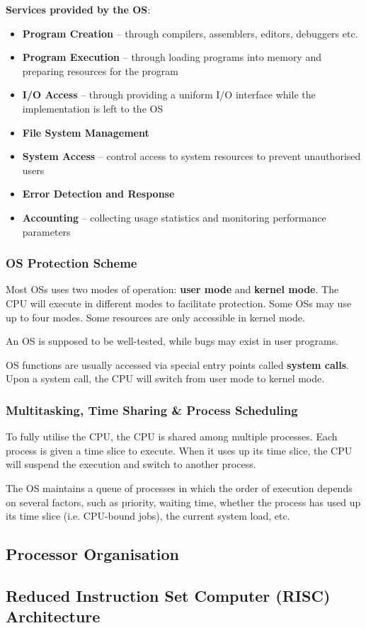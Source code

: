 \textbf{Services provided by the OS}:
\begin{itemize}
    \item \textbf{Program Creation} -- through compilers, assemblers, editors, debuggers etc.
    \item \textbf{Program Execution} -- through loading programs into memory and preparing resources for the program
    \item \textbf{I/O Access} -- through providing a uniform I/O interface while the implementation is left to the OS
    \item \textbf{File System Management}
    \item \textbf{System Access} -- control access to system resources to prevent unauthorised users
    \item \textbf{Error Detection and Response}
    \item \textbf{Accounting} -- collecting usage statistics and monitoring performance parameters
\end{itemize}

\subsubsection{OS Protection Scheme}

Most OSs uses two modes of operation: \textbf{user mode} and \textbf{kernel mode}.
The CPU will execute in different modes to facilitate protection. Some OSs may use up
to four modes. Some resources are only accessible in kernel mode.

An OS is supposed to be well-tested, while bugs may exist in user programs.

OS functions are usually accessed via special entry points called \textbf{system calls}.
Upon a system call, the CPU will switch from user mode to kernel mode.

\subsubsection{Multitasking, Time Sharing \& Process Scheduling}

To fully utilise the CPU, the CPU is shared among multiple processes. Each process
is given a time slice to execute. When it uses up its time slice, the CPU will
suspend the execution and switch to another process.

The OS maintains a queue of processes in which the order of execution depends on
several factors, such as priority, waiting time, whether the process has used up
its time slice (i.e. CPU-bound jobs), the current system load, etc.

\subsection{Processor Organisation}

\subsection{Reduced Instruction Set Computer (RISC) Architecture}